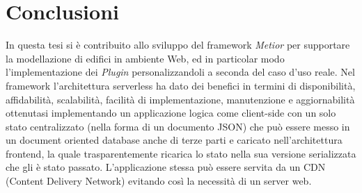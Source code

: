 \section{Conclusioni}
\label{sec:conclusions_section_1}

In questa tesi si è contribuito allo sviluppo del framework \emph{Metior}
per supportare la modellazione di edifici in ambiente Web, ed in particolar modo l'implementazione dei \emph{Plugin}
personalizzandoli a seconda del caso d'uso reale.
Nel framework l'architettura serverless ha dato dei benefici
in termini di disponibilità, affidabilità,  scalabilità, facilità di implementazione, manutenzione e aggiornabilità
ottenutasi implementando un applicazione logica come client-side con un solo stato centralizzato
(nella forma di un documento JSON) che può essere messo in un
document oriented database anche di terze parti e caricato nell'architettura frontend, la quale
trasparentemente ricarica lo stato nella sua versione serializzata che gli è stato passato.
L'applicazione stessa può essere servita da un CDN (Content Delivery Network) evitando così la necessità di un server web.
